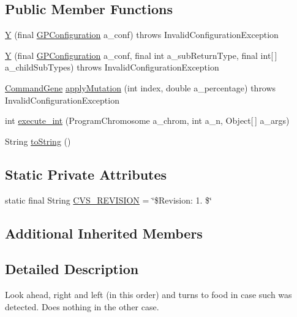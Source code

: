 \subsection*{Public Member Functions}
\begin{DoxyCompactItemize}
\item 
\hyperlink{classexamples_1_1gp_1_1painted_desert_1_1_y_ab3609c3cd7b2f22bd4ec2b288f3181ae}{Y} (final \hyperlink{classorg_1_1jgap_1_1gp_1_1impl_1_1_g_p_configuration}{G\-P\-Configuration} a\-\_\-conf)  throws Invalid\-Configuration\-Exception 
\item 
\hyperlink{classexamples_1_1gp_1_1painted_desert_1_1_y_add89e5cf22ab18766903998f097d65c8}{Y} (final \hyperlink{classorg_1_1jgap_1_1gp_1_1impl_1_1_g_p_configuration}{G\-P\-Configuration} a\-\_\-conf, final int a\-\_\-sub\-Return\-Type, final int\mbox{[}$\,$\mbox{]} a\-\_\-child\-Sub\-Types)  throws Invalid\-Configuration\-Exception 
\item 
\hyperlink{classorg_1_1jgap_1_1gp_1_1_command_gene}{Command\-Gene} \hyperlink{classexamples_1_1gp_1_1painted_desert_1_1_y_a14a00431b0568b7bc919e50779df948f}{apply\-Mutation} (int index, double a\-\_\-percentage)  throws Invalid\-Configuration\-Exception 
\item 
int \hyperlink{classexamples_1_1gp_1_1painted_desert_1_1_y_a21ec80740ef1ef8a1a2ab173cd5348f0}{execute\-\_\-int} (Program\-Chromosome a\-\_\-chrom, int a\-\_\-n, Object\mbox{[}$\,$\mbox{]} a\-\_\-args)
\item 
String \hyperlink{classexamples_1_1gp_1_1painted_desert_1_1_y_ad781244173a77a8a0aaf7d17db4527c2}{to\-String} ()
\end{DoxyCompactItemize}
\subsection*{Static Private Attributes}
\begin{DoxyCompactItemize}
\item 
static final String \hyperlink{classexamples_1_1gp_1_1painted_desert_1_1_y_a8503965a5df0a9175eb9c3a97c0676b5}{C\-V\-S\-\_\-\-R\-E\-V\-I\-S\-I\-O\-N} = \char`\"{}\$Revision\-: 1. \$\char`\"{}
\end{DoxyCompactItemize}
\subsection*{Additional Inherited Members}


\subsection{Detailed Description}
Look ahead, right and left (in this order) and turns to food in case such was detected. Does nothing in the other case.


